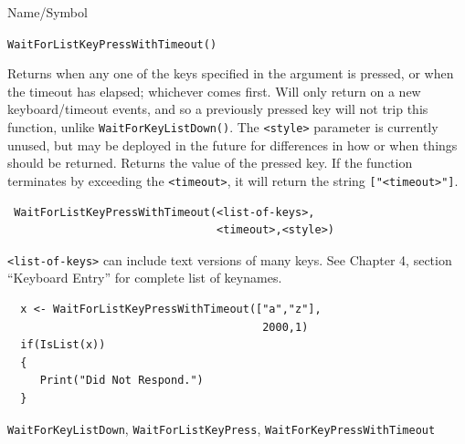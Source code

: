 \begin{desc}{Name/Symbol}
\item[Name/Symbol]  	\verb+WaitForListKeyPressWithTimeout()+

\item[Description] Returns when any one of the keys specified in the
  argument is pressed, or when the timeout has elapsed; whichever
  comes first. Will only return on a new keyboard/timeout events, and
  so a previously pressed key will not trip this function, unlike
  \verb+WaitForKeyListDown()+.  The \verb+<style>+ parameter is currently
  unused, but may be deployed in the future for differences in how
  or when things should be returned.  Returns the value of the pressed
  key.  If the function terminates by exceeding the \verb+<timeout>+,
  it will return the string \verb+["<timeout>"]+.

\item[Usage]
\begin{verbatim}
 WaitForListKeyPressWithTimeout(<list-of-keys>,
                                <timeout>,<style>)
\end{verbatim}

\verb+<list-of-keys>+ can include text versions of many keys.  See Chapter 4,
section ``Keyboard Entry'' for complete list of keynames.

\item[Example]     	
\begin{verbatim}
  x <- WaitForListKeyPressWithTimeout(["a","z"],
                                       2000,1)
  if(IsList(x))
  {
     Print("Did Not Respond.")
  }
\end{verbatim}

\item[See Also]	
   \verb+WaitForKeyListDown+, \verb+WaitForListKeyPress+, \verb+WaitForKeyPressWithTimeout+
 \end{desc}







